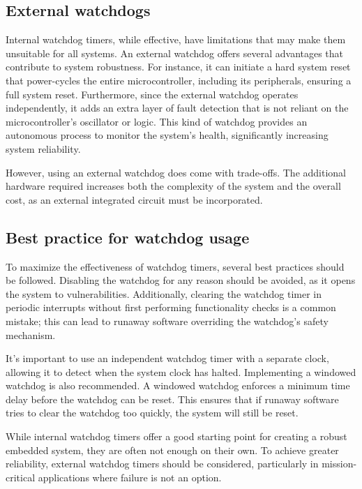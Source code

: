 \subsection{External watchdogs}
Internal watchdog timers, while effective, have limitations that may make them unsuitable for all systems. 
An external watchdog offers several advantages that contribute to system robustness.
For instance, it can initiate a hard system reset that power-cycles the entire microcontroller, including its peripherals, ensuring a full system reset. 
Furthermore, since the external watchdog operates independently, it adds an extra layer of fault detection that is not reliant on the microcontroller's oscillator or logic. 
This kind of watchdog provides an autonomous process to monitor the system's health, significantly increasing system reliability.

However, using an external watchdog does come with trade-offs. 
The additional hardware required increases both the complexity of the system and the overall cost, as an external integrated circuit must be incorporated.

\subsection{Best practice for watchdog usage}
To maximize the effectiveness of watchdog timers, several best practices should be followed. Disabling the watchdog for any reason should be avoided, as it opens the system to vulnerabilities. 
Additionally, clearing the watchdog timer in periodic interrupts without first performing functionality checks is a common mistake; this can lead to runaway software overriding the watchdog's safety mechanism.

It's important to use an independent watchdog timer with a separate clock, allowing it to detect when the system clock has halted. Implementing a windowed watchdog is also recommended. 
A windowed watchdog enforces a minimum time delay before the watchdog can be reset. 
This ensures that if runaway software tries to clear the watchdog too quickly, the system will still be reset.

While internal watchdog timers offer a good starting point for creating a robust embedded system, they are often not enough on their own. 
To achieve greater reliability, external watchdog timers should be considered, particularly in mission-critical applications where failure is not an option.